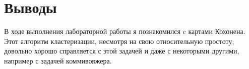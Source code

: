 \section{Выводы}
В ходе выполнения лабораторной работы я познакомился c картами Кохонена. Этот алгоритм кластеризации, несмотря на свою относительную простоту, довольно хорошо справляется с этой задачей и даже с некоторыми другими, например с задачей коммивояжера.
\pagebreak
